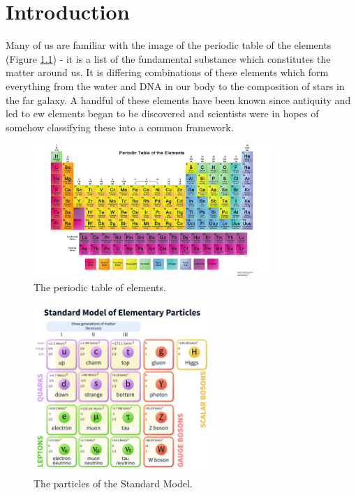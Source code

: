 \chapter{Introduction}

Many of us are familiar with the image of the periodic table of the elements (Figure \ref{fig:periodictable}) - it is a list of the fundamental substance which constitutes the matter around us. It is differing combinations of these elements which form everything from the water and DNA in our body to the composition of stars in the far galaxy. A handful of these elements have been known since antiquity and led to ew elements began to be discovered and scientists were in hopes of somehow classifying these into a common framework.  

\begin{figure}[hb!]
\centering
\includegraphics[width=0.8\textwidth]{figs/PeriodicTable.pdf}
\caption{The periodic table of elements.}
\label{fig:periodictable}
\end{figure}

\begin{figure}[htbp]
\centering
\includegraphics[width=0.6\textwidth]{figs/StandardModelofElementaryParticles.pdf}
\caption{The particles of the Standard Model.}
\label{fig:sm}
\end{figure}

